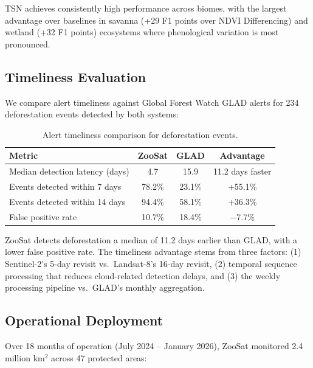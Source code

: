 \documentclass[11pt,a4paper]{article}
\begin{document}
TSN achieves consistently high performance across biomes, with the largest advantage over baselines in savanna (+29 F1 points over NDVI Differencing) and wetland (+32 F1 points) ecosystems where phenological variation is most pronounced.

\subsection{Timeliness Evaluation}

We compare alert timeliness against Global Forest Watch GLAD alerts for 234 deforestation events detected by both systems:

\begin{table}[H]
\centering
\caption{Alert timeliness comparison for deforestation events.}
\label{tab:timeliness}
\begin{tabular}{@{}lccc@{}}
\toprule
\textbf{Metric} & \textbf{ZooSat} & \textbf{GLAD} & \textbf{Advantage} \\
\midrule
Median detection latency (days) & 4.7 & 15.9 & 11.2 days faster \\
Events detected within 7 days & 78.2\% & 23.1\% & +55.1\% \\
Events detected within 14 days & 94.4\% & 58.1\% & +36.3\% \\
False positive rate & 10.7\% & 18.4\% & $-$7.7\% \\
\bottomrule
\end{tabular}
\end{table}

ZooSat detects deforestation a median of 11.2 days earlier than GLAD, with a lower false positive rate.
The timeliness advantage stems from three factors: (1) Sentinel-2's 5-day revisit vs.\ Landsat-8's 16-day revisit, (2) temporal sequence processing that reduces cloud-related detection delays, and (3) the weekly processing pipeline vs.\ GLAD's monthly aggregation.

\subsection{Operational Deployment}

Over 18 months of operation (July 2024 -- January 2026), ZooSat monitored 2.4 million km$^2$ across 47 protected areas:
\end{document}
